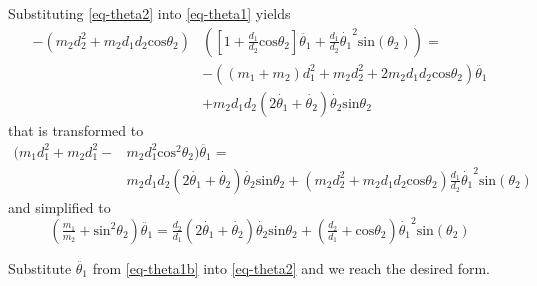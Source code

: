 \documentclass[12pt]{article}
\begin{document}
Substituting \eqref{eq-theta2} into \eqref{eq-theta1} yields
\begin{equation*}
\begin{split}
 - \left( m_2 d_2^2 + m_2 d_1 d_2 \mathrm{cos}\theta_2 \right) &\left( \left[ 1 + \frac{d_1}{d_2} \mathrm{cos}\theta_2 \right] \ddot{\theta_1} + \frac{d_1}{d_2} \dot{\theta_1}^2 \mathrm{sin}(\theta_2) \right) = \\
  &- \left( (m_1 + m_2) d_1^2 + m_2 d_2^2 + 2 m_2 d_1 d_2 \mathrm{cos}\theta_2 \right) \ddot{\theta_1}\\ 
 &+ m_2 d_1 d_2 (2 \dot{\theta_1} + \dot{\theta_2}) \dot{\theta_2} \mathrm{sin}\theta_2 
\end{split}
\end{equation*}
that is transformed to
\begin{equation*}
\begin{split}
 \big( m_1 d_1^2 + m_2 d_1^2 -& m_2 d_1^2 \mathrm{cos}^2\theta_2 \big) \ddot{\theta_1} =\\
 & m_2 d_1 d_2 (2 \dot{\theta_1} + \dot{\theta_2}) \dot{\theta_2} \mathrm{sin}\theta_2 
 + \left( m_2 d_2^2 + m_2 d_1 d_2 \mathrm{cos}\theta_2 \right) \frac{d_1}{d_2} \dot{\theta_1}^2 \mathrm{sin}(\theta_2)
\end{split}
\end{equation*}
and simplified to
\begin{equation}\label{eq-theta1b}
 \left( \tfrac{m_1}{m_2} + \mathrm{sin}^2\theta_2 \right) \ddot{\theta_1} =
  \tfrac{d_2}{d_1} (2 \dot{\theta_1} + \dot{\theta_2}) \dot{\theta_2} \mathrm{sin}\theta_2 
 + \left( \tfrac{d_2}{d_1} + \mathrm{cos}\theta_2 \right) \dot{\theta_1}^2 \mathrm{sin}(\theta_2)
\end{equation}

Substitute $\ddot{\theta_1}$ from \eqref{eq-theta1b} into \eqref{eq-theta2} and we reach the desired form.
\end{document}
